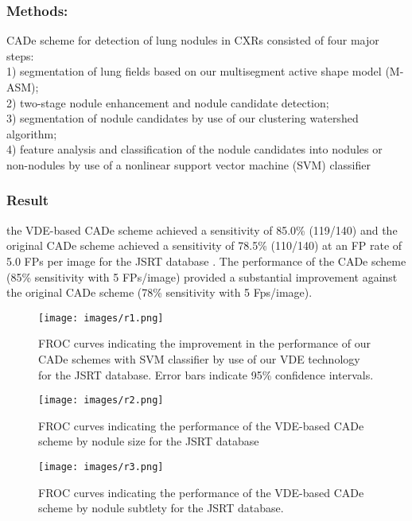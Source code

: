 \documentclass[hidelinks,12pt]{article}
\begin{document}
\subsubsection{Methods:}
CADe scheme for detection of lung nodules in CXRs consisted of four major steps:\\
1) segmentation of lung fields based on our multisegment active shape model (M-ASM);\\
2) two-stage nodule enhancement and nodule candidate detection;\\
3) segmentation of nodule candidates by use of our clustering
watershed algorithm;  \\
4) feature analysis and classification of the nodule candidates into nodules or non-nodules by
use of a nonlinear support vector machine (SVM) classifier\\

\subsubsection{Result}

the VDE-based CADe scheme achieved a sensitivity of 85.0\% (119/140) and the original CADe scheme achieved a sensitivity of 78.5\% (110/140) at an FP rate of 5.0 FPs per image for the JSRT database .
The performance of the CADe scheme (85\% sensitivity with 5 FPs/image) provided a substantial improvement against the original CADe scheme (78\% sensitivity with 5 Fps/image).


\begin{figure}[h]
      \texttt{[image: images/r1.png]}
      \centering
      \label{fig:10}
      \caption{FROC curves indicating the improvement in the performance of our CADe schemes with SVM classifier by use of our VDE technology for the JSRT database. Error bars indicate 95\% confidence intervals.}
\end{figure} 

\newpage

\begin{figure}[h]
      \texttt{[image: images/r2.png]}
      \centering
      \label{fig:11}
      \caption{FROC curves indicating the performance of the VDE-based CADe
scheme by nodule size for the JSRT database}
\end{figure} 



\begin{figure}[h]
      \texttt{[image: images/r3.png]}
      \centering
      \label{fig:12}
      \caption{FROC curves indicating the performance of the VDE-based CADe scheme by nodule subtlety for the JSRT database.}
\end{figure} 
\end{document}
